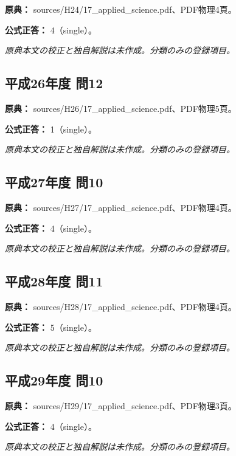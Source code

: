 \noindent\textbf{原典：} sources/H24/17\_applied\_science.pdf、PDF物理4頁。

\textbf{公式正答：} 4（single）。

\par\textit{原典本文の校正と独自解説は未作成。分類のみの登録項目。}

\subsection{平成26年度 問12}
\label{q:h26-reg-applied-12}

\noindent\textbf{原典：} sources/H26/17\_applied\_science.pdf、PDF物理5頁。

\textbf{公式正答：} 1（single）。

\par\textit{原典本文の校正と独自解説は未作成。分類のみの登録項目。}

\subsection{平成27年度 問10}
\label{q:h27-reg-applied-10}

\noindent\textbf{原典：} sources/H27/17\_applied\_science.pdf、PDF物理4頁。

\textbf{公式正答：} 4（single）。

\par\textit{原典本文の校正と独自解説は未作成。分類のみの登録項目。}

\subsection{平成28年度 問11}
\label{q:h28-reg-applied-11}

\noindent\textbf{原典：} sources/H28/17\_applied\_science.pdf、PDF物理4頁。

\textbf{公式正答：} 5（single）。

\par\textit{原典本文の校正と独自解説は未作成。分類のみの登録項目。}

\subsection{平成29年度 問10}
\label{q:h29-reg-applied-10}

\noindent\textbf{原典：} sources/H29/17\_applied\_science.pdf、PDF物理3頁。

\textbf{公式正答：} 4（single）。

\par\textit{原典本文の校正と独自解説は未作成。分類のみの登録項目。}

